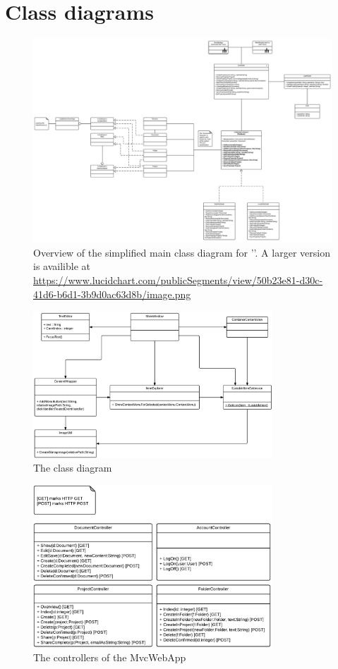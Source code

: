 \section{Class diagrams}
\label{sec:class-diagrams-appendix}

\begin{figure}[H]
    \begin{center}
        \includegraphics[angle=270, width=1\textwidth]{Software_design/graphics/mainClassDiagram.png}
	\caption{Overview of the simplified main class diagram for '\SOP{}'. A larger version is availible at \url{https://www.lucidchart.com/publicSegments/view/50b23e81-d30c-41d6-b6d1-3b9d0ac63d8b/image.png}}
        \label{fig:design-class_diagram} 
    \end{center}
\end{figure}

\begin{figure}[htb]
    \centering
    \includegraphics[width=0.8\textwidth]{Software_design/graphics/MainWindow.png}
    \caption{The \SOP{} class diagram}
    \label{fig:mainwindow-diagram}
\end{figure}

\begin{figure}[hbt]
    \centering
    \includegraphics[width=0.8\textwidth]{Software_design/graphics/MvcWebApp.png}
    \caption{The controllers of the MvcWebApp}
    \label{fig:mvcwebapp-diagram}
\end{figure}